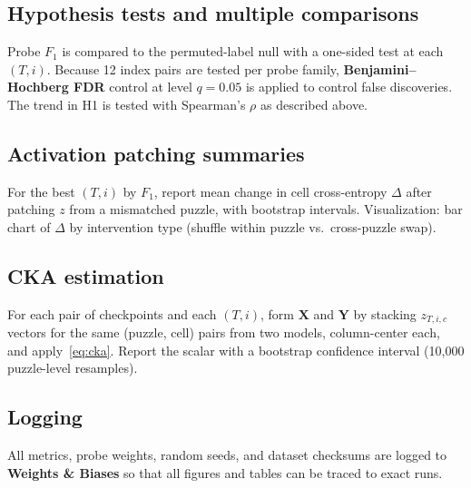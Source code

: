 \documentclass{article}
\begin{document}
\subsection{Hypothesis tests and multiple comparisons}

Probe $F_1$ is compared to the permuted-label null with a one-sided test at each $(T,i)$.  Because 12 index pairs are tested per probe family, \textbf{Benjamini--Hochberg FDR} control at level $q = 0.05$ is applied to control false discoveries.  The trend in H1 is tested with Spearman's $\rho$ as described above.

\subsection{Activation patching summaries}

For the best $(T,i)$ by $F_1$, report mean change in cell cross-entropy $\Delta$ after patching $z$ from a mismatched puzzle, with bootstrap intervals.  Visualization: bar chart of $\Delta$ by intervention type (shuffle within puzzle vs.\ cross-puzzle swap).

\subsection{CKA estimation}

For each pair of checkpoints and each $(T,i)$, form $\mathbf{X}$ and $\mathbf{Y}$ by stacking $z_{T,i,c}$ vectors for the same (puzzle, cell) pairs from two models, column-center each, and apply~\eqref{eq:cka}.  Report the scalar with a bootstrap confidence interval (10{,}000 puzzle-level resamples).

\subsection{Logging}

All metrics, probe weights, random seeds, and dataset checksums are logged to \textbf{Weights \& Biases} so that all figures and tables can be traced to exact runs.




\end{document}
